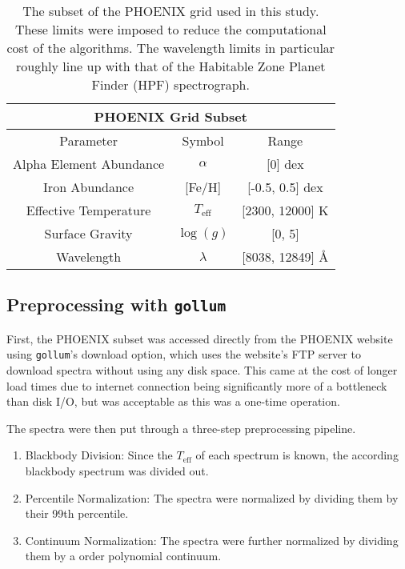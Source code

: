 \documentclass[twocolumn]{aastex631}
\begin{document}
\begin{table}[h]
    \hspace*{-1.1cm}\begin{tabular}{|c|c|c|}
        \hline
        \multicolumn{3}{|c|}{\textbf{PHOENIX Grid Subset}}\\
        \hline\hline
        Parameter & Symbol & Range\\
        \hline
        Alpha Element Abundance & $\alpha$ & [0] dex\\
        Iron Abundance & [Fe/H] & [-0.5, 0.5] dex\\
        Effective Temperature & $T_{\mathrm{eff}}$ & [2300, 12000] K\\
        Surface Gravity & $\log(g)$ & [0, 5]\\
        Wavelength & $\lambda$ & [8038, 12849] \AA\\
        \hline
    \end{tabular}
    \caption{The subset of the PHOENIX grid used in this study. These limits 
    were imposed to reduce the computational cost of the algorithms. The 
    wavelength limits in particular roughly line up with that of the 
    Habitable Zone Planet Finder (HPF) spectrograph.}
\end{table}

\subsection{Preprocessing with \texttt{gollum}}
First, the PHOENIX subset was accessed directly from the PHOENIX website
using \texttt{gollum}'s download option, which uses the website's FTP server
to download spectra without using any disk space. This came at the cost of
longer load times due to internet connection being significantly more of a
bottleneck than disk I/O, but was acceptable as this was a one-time operation.

The spectra were then put through a three-step preprocessing pipeline.
\begin{enumerate}
    \item Blackbody Division: Since the $T_{\mathrm{eff}}$ of each spectrum 
    is known, the according blackbody spectrum was divided out.
    \item Percentile Normalization: The spectra were normalized by dividing
    them by their 99th percentile.
    \item Continuum Normalization: The spectra were further normalized by 
    dividing them by a  order polynomial continuum.
\end{enumerate}
\end{document}
